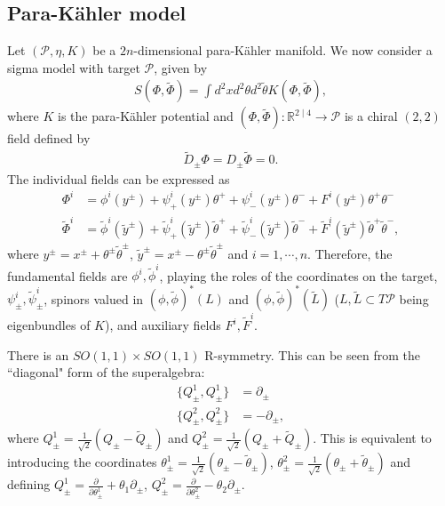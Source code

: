 \documentclass{article}
\newcommand{\RR}{\mathbb{R}}
\newcommand{\PS}{\mathcal{P}}
\newcommand{\p}{\partial}
\newcommand{\tth}{\tl{\theta}}
\def\tl{\tilde}
\theoremstyle{definition}
\theoremstyle{definition}
\theoremstyle{remark}
\begin{document}
\subsection*{Para-K\"ahler model}
Let $(\PS,\eta,K)$ be a $2n$-dimensional para-K\"ahler manifold. We now consider a sigma model with target $\PS$, given by
\begin{align*}
S(\Phi,\tl{\Phi})=\int d^2x d^2 \theta d^2 \tth K(\Phi,\tl{\Phi}),
\end{align*}
where $K$ is the para-K\"ahler potential and $(\Phi,\tl{\Phi}):\RR^{2\mid 4}\rightarrow \PS$ is a chiral $(2,2)$ field defined by
\begin{align*}
\tl{D}_\pm \Phi=D_\pm \tl{\Phi}=0.
\end{align*}
The individual fields can be expressed as
\begin{align*}
\Phi^i&=\phi^i(y^\pm)+\psi^i_+(y^\pm)\theta^++\psi^i_-(y^\pm)\theta^-+F^i(y^\pm)\theta^+\theta^-\\
\tl{\Phi}^i&=\tl{\phi}^i(\tl{y}^\pm)+\tl{\psi}^i_+(\tl{y}^\pm)\tth^++\tl{\psi}^i_-(\tl{y}^\pm)\tth^-+\tl{F}^i(\tl{y}^\pm)\tth^+\tth^-,
\end{align*}
where $y^\pm=x^\pm+\theta^\pm\tth^\pm$, $\tl{y}^\pm=x^\pm-\theta^\pm\tth^\pm$ and $i=1,\cdots,n$. Therefore, the fundamental fields are $\phi^i,\tl{\phi}^i$, playing the roles of the coordinates on the target, $\psi^i_\pm,\tl{\psi}^i_\pm$, spinors valued in $(\phi,\tl{\phi})^*(L)$ and $(\phi,\tl{\phi})^*(\tl{L})$ ($L, \tl{L} \subset T\PS$ being eigenbundles of $K$), and auxiliary fields $F^i,\tl{F}^i$.

There is an $SO(1,1)\times SO(1,1)$ R-symmetry. This can be seen from the ``diagonal" form of the superalgebra:
\begin{align*}
\{Q_\pm^1,Q_\pm^1\}&=\p_\pm\\
\{Q_\pm^2,Q_\pm^2\}&=-\p_\pm,
\end{align*}
where $Q_\pm^1=\frac{1}{\sqrt{2}}( Q_\pm-\tl{Q}_\pm)$ and $Q_\pm^2=\frac{1}{\sqrt{2}}( Q_\pm+\tl{Q}_\pm)$. This is equivalent to introducing the coordinates $\theta^1_\pm=\frac{1}{\sqrt{2}}(\theta_\pm-\tth_\pm)$, $\theta^2_\pm=\frac{1}{\sqrt{2}}(\theta_\pm+\tth_\pm)$ and defining $Q^1_\pm=\frac{\p}{\p \theta^1_\pm}+\theta_1\p_\pm$, $Q^2_\pm=\frac{\p}{\p \theta^2_\pm}-\theta_2\p_\pm$.
\end{document}
